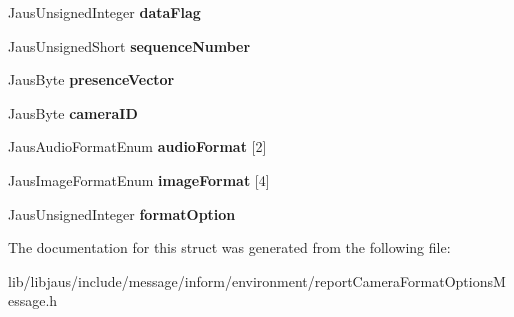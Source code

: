 \begin{DoxyCompactItemize}
\item 
\hypertarget{struct_report_camera_format_options_message_struct_a239f98501be5671857737c6d21a5253f}{\-Jaus\-Unsigned\-Integer {\bfseries data\-Flag}}\label{struct_report_camera_format_options_message_struct_a239f98501be5671857737c6d21a5253f}

\item 
\hypertarget{struct_report_camera_format_options_message_struct_a2eb65f71f526865387a610ada4a8d844}{\-Jaus\-Unsigned\-Short {\bfseries sequence\-Number}}\label{struct_report_camera_format_options_message_struct_a2eb65f71f526865387a610ada4a8d844}

\item 
\hypertarget{struct_report_camera_format_options_message_struct_a40d7463cfb6ee99335be30f7e0118914}{\-Jaus\-Byte {\bfseries presence\-Vector}}\label{struct_report_camera_format_options_message_struct_a40d7463cfb6ee99335be30f7e0118914}

\item 
\hypertarget{struct_report_camera_format_options_message_struct_aa3a1841706b326a072dd12447cadb729}{\-Jaus\-Byte {\bfseries camera\-I\-D}}\label{struct_report_camera_format_options_message_struct_aa3a1841706b326a072dd12447cadb729}

\item 
\hypertarget{struct_report_camera_format_options_message_struct_a894a7b11d8c56c7a96da320cc39bbe9c}{\-Jaus\-Audio\-Format\-Enum {\bfseries audio\-Format} \mbox{[}2\mbox{]}}\label{struct_report_camera_format_options_message_struct_a894a7b11d8c56c7a96da320cc39bbe9c}

\item 
\hypertarget{struct_report_camera_format_options_message_struct_a36da37d43c233ab96495e2c08ab9cf1a}{\-Jaus\-Image\-Format\-Enum {\bfseries image\-Format} \mbox{[}4\mbox{]}}\label{struct_report_camera_format_options_message_struct_a36da37d43c233ab96495e2c08ab9cf1a}

\item 
\hypertarget{struct_report_camera_format_options_message_struct_a0c7e19c0fb8e4ae06a86c9df37daea18}{\-Jaus\-Unsigned\-Integer {\bfseries format\-Option}}\label{struct_report_camera_format_options_message_struct_a0c7e19c0fb8e4ae06a86c9df37daea18}

\end{DoxyCompactItemize}


\-The documentation for this struct was generated from the following file\-:\begin{DoxyCompactItemize}
\item 
lib/libjaus/include/message/inform/environment/report\-Camera\-Format\-Options\-Message.\-h\end{DoxyCompactItemize}
